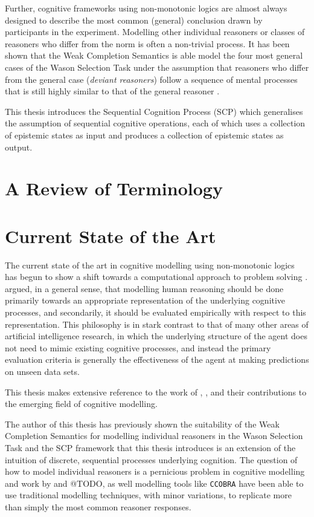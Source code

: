 Further, cognitive frameworks using non-monotonic logics are almost always designed to describe the most common (general) conclusion drawn by participants in the experiment. Modelling other individual reasoners or classes of reasoners who differ from the norm is often a non-trivial process. It has been shown that the Weak Completion Semantics \citep{holldobler2015weak} is able model the four most general cases of the Wason Selection Task under the assumption that reasoners who differ from the general case (\textit{deviant reasoners}) follow a sequence of mental processes that is still highly similar to that of the general reasoner \citep{breu2019weak}.

This thesis introduces the Sequential Cognition Process (SCP) which generalises the assumption of sequential cognitive operations, each of which uses a collection of epistemic states as input and produces a collection of epistemic states as output. 


\section{A Review of Terminology} \label{sec:terminology}
\section{Current State of the Art} \label{sec:soa}
The current state of the art in cognitive modelling using non-monotonic logics has begun to show a shift towards a computational approach to problem solving \citep{dietz2012computational}. \cite{stenning2012human} argued, in a general sense, that modelling human reasoning should be done primarily towards an appropriate representation of the underlying cognitive processes, and secondarily, it should be evaluated empirically with respect to this representation. This philosophy is in stark contrast to that of many other areas of artificial intelligence research, in which the underlying structure of the agent does not need to mimic existing cognitive processes, and instead the primary evaluation criteria is generally the effectiveness of the agent at making predictions on unseen data sets.

This thesis makes extensive reference to the work of \cite{dietz2012computational}, \cite{dietz2014modeling}, \cite{ragni2017wason} and their contributions to the emerging field of cognitive modelling. 

The author of this thesis has previously shown the suitability of the Weak Completion Semantics for modelling individual reasoners in the Wason Selection Task \citep{breu2019weak} and the SCP framework that this thesis introduces is an extension of the intuition of discrete, sequential processes underlying cognition. The question of how to model individual reasoners is a pernicious problem in cognitive modelling and work by \cite{breu2019weak} and @TODO, as well modelling tools like \texttt{CCOBRA} \citep{ccobra} have been able to use traditional modelling techniques, with minor variations, to replicate more than simply the most common reasoner responses.



